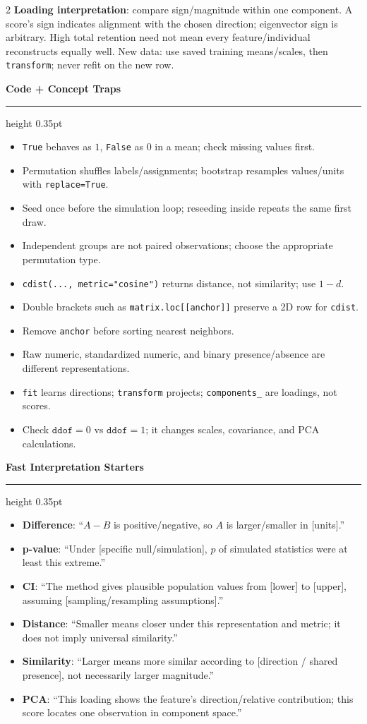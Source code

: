 \documentclass[8pt]{article}
\newcommand{\sect}[1]{\vspace{1pt}\textcolor{accent}{\textbf{\normalsize #1}}\par\vspace{1pt}\hrule height 0.35pt\vspace{0pt}}
\newcommand{\term}[1]{\textbf{#1}}
\newcommand{\code}[1]{\texttt{#1}}
\begin{document}
\begin{multicols*}{2}
\term{Loading interpretation}: compare sign/magnitude within one component. A score's sign indicates alignment with the chosen direction; eigenvector sign is arbitrary. High total retention need not mean every feature/individual reconstructs equally well. New data: use saved training means/scales, then \code{transform}; never refit on the new row.

\sect{Code + Concept Traps}
\begin{itemize}
\item \code{True} behaves as $1$, \code{False} as $0$ in a mean; check missing values first.
\item Permutation shuffles labels/assignments; bootstrap resamples values/units with \code{replace=True}.
\item Seed once before the simulation loop; reseeding inside repeats the same first draw.
\item Independent groups are not paired observations; choose the appropriate permutation type.
\item \code{cdist(..., metric="cosine")} returns distance, not similarity; use $1-d$.
\item Double brackets such as \code{matrix.loc[[anchor]]} preserve a 2D row for \code{cdist}.
\item Remove \code{anchor} before sorting nearest neighbors.
\item Raw numeric, standardized numeric, and binary presence/absence are different representations.
\item \code{fit} learns directions; \code{transform} projects; \code{components\_} are loadings, not scores.
\item Check $\texttt{ddof}=0$ vs $\texttt{ddof}=1$; it changes scales, covariance, and PCA calculations.
\end{itemize}

\sect{Fast Interpretation Starters}
\begin{itemize}
\item \term{Difference}: ``$A-B$ is positive/negative, so $A$ is larger/smaller in [units].''
\item \term{p-value}: ``Under [specific null/simulation], $p$ of simulated statistics were at least this extreme.''
\item \term{CI}: ``The method gives plausible population values from [lower] to [upper], assuming [sampling/resampling assumptions].''
\item \term{Distance}: ``Smaller means closer under this representation and metric; it does not imply universal similarity.''
\item \term{Similarity}: ``Larger means more similar according to [direction / shared presence], not necessarily larger magnitude.''
\item \term{PCA}: ``This loading shows the feature's direction/relative contribution; this score locates one observation in component space.''
\end{itemize}


\end{multicols*}
\end{document}
